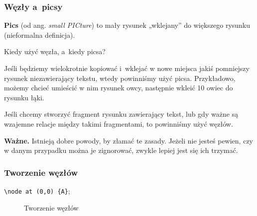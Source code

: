 \documentclass[10pt,t]{beamer}
\begin{document}
\begin{frame}
  \frametitle{Węzły a~picsy}


  \textbf{Pics} (od ang. \textit{small PICture}) to mały rysunek
  „wklejany” do większego rysunku (nieformalna definicja).

  Kiedy użyć węzła, a~kiedy picsa?

  Jeśli będziemy wielokrotnie kopiować i~wklejać w nowe miejsca jakiś
  pomniejszy rysunek niezawierający tekstu, wtedy powinniśmy użyć
  picsa. Przykładowo, możemy chcieć umieścić w nim rysunek owcy,
  następnie wkleić 10 owiec do rysunku łąki.

  Jeśli chcemy stworzyć fragment rysunku zawierający tekst, lub gdy
  ważne są wzajemne relacje między takimi fragmentami, to powinniśmy
  użyć węzłów.

  \textbf{Ważne.} Istnieją dobre powody, by złamać te zasady. Jeżeli
  nie jesteś pewien, czy w danym przypadku można je zignorować, zwykle
  lepiej jest się ich trzymać.

\end{frame}





\begin{frame}
  \frametitle{Tworzenie węzłów}


  \texttt{\textbackslash node at (0,0) \{A\}};





  \begin{figure}

    \centering

    \begin{tikzpicture}




    \end{tikzpicture}

    \caption{Tworzenie węzłów}

  \end{figure}

\end{frame}
\end{document}
